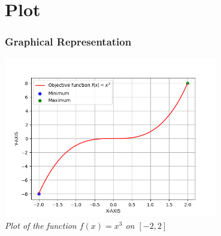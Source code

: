 \documentclass{beamer}
\begin{document}
\section{Plot}
\begin{frame}
\frametitle{Graphical Representation}
\begin{center}
\includegraphics[width=0.7\textwidth]{fig.png} \\
\textit{Plot of the function $f(x) = x^3$ on $[-2, 2]$}
\end{center}
\end{frame}
\end{document}
